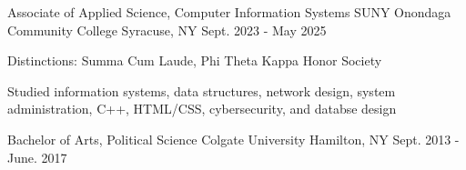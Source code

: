 


\begin{cventries}



\cventry
{Associate of Applied Science, Computer Information Systems} %
{SUNY Onondaga Community College} %
{Syracuse, NY} %
{Sept. 2023 - May 2025} %
{ %
\begin{cvitems}
\item {Distinctions: Summa Cum Laude, Phi Theta Kappa Honor Society}
\item {Studied information systems, data structures, network design, system administration, C++, HTML/CSS, cybersecurity, and databse design}
\end{cvitems}
}

\vspace{3mm}

\end{cventries}

\begin{cventries}


\cventry
{Bachelor of Arts, Political Science} %
{Colgate University} %
{Hamilton, NY} %
{Sept. 2013 - June. 2017} %
{ %
}


\end{cventries}
